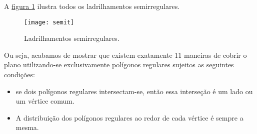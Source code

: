 A \hyperref[semit]{figura \ref{semit}} ilustra todos os ladrilhamentos semirregulares.


\begin{figure}[H]
\centering
\texttt{[image: semit]}
\caption{Ladrilhamentos semirregulares.}
\label{semit}
\end{figure}

Ou seja, acabamos de mostrar que existem exatamente 11 maneiras de  cobrir o plano utilizando-se exclusivamente polígonos regulares sujeitos as seguintes condições:
\begin{itemize}
\item se dois polígonos regulares intersectam-se, então essa interseção é um lado ou um vértice comum.
\item A distribuição dos polígonos regulares ao redor de cada vértice é sempre a mesma.
\end{itemize}



